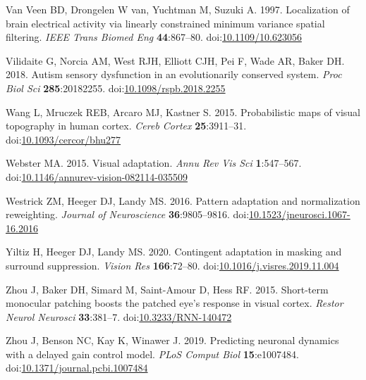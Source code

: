 \documentclass[
]{article}
\newlength{\cslhangindent}
\newlength{\cslentryspacingunit} %
\newenvironment{CSLReferences}[2] %
 {%
  \setlength{\parindent}{0pt}
  \ifodd #1
  \let\oldpar\par
  \def\par{\hangindent=\cslhangindent\oldpar}
  \fi
  \setlength{\parskip}{#2\cslentryspacingunit}
 }%
 {}
\begin{document}
\begin{CSLReferences}{1}{0}
\leavevmode{}%
Van Veen BD, Drongelen W van, Yuchtman M, Suzuki A. 1997. Localization of brain electrical activity via linearly constrained minimum variance spatial filtering. \emph{IEEE Trans Biomed Eng} \textbf{44}:867--80. doi:\href{https://doi.org/10.1109/10.623056}{10.1109/10.623056}

\leavevmode{}%
Vilidaite G, Norcia AM, West RJH, Elliott CJH, Pei F, Wade AR, Baker DH. 2018. Autism sensory dysfunction in an evolutionarily conserved system. \emph{Proc Biol Sci} \textbf{285}:20182255. doi:\href{https://doi.org/10.1098/rspb.2018.2255}{10.1098/rspb.2018.2255}

\leavevmode{}%
Wang L, Mruczek REB, Arcaro MJ, Kastner S. 2015. Probabilistic maps of visual topography in human cortex. \emph{Cereb Cortex} \textbf{25}:3911--31. doi:\href{https://doi.org/10.1093/cercor/bhu277}{10.1093/cercor/bhu277}

\leavevmode{}%
Webster MA. 2015. Visual adaptation. \emph{Annu Rev Vis Sci} \textbf{1}:547--567. doi:\href{https://doi.org/10.1146/annurev-vision-082114-035509}{10.1146/annurev-vision-082114-035509}

\leavevmode{}%
Westrick ZM, Heeger DJ, Landy MS. 2016. Pattern adaptation and normalization reweighting. \emph{Journal of Neuroscience} \textbf{36}:9805--9816. doi:\href{https://doi.org/10.1523/jneurosci.1067-16.2016}{10.1523/jneurosci.1067-16.2016}

\leavevmode{}%
Yiltiz H, Heeger DJ, Landy MS. 2020. Contingent adaptation in masking and surround suppression. \emph{Vision Res} \textbf{166}:72--80. doi:\href{https://doi.org/10.1016/j.visres.2019.11.004}{10.1016/j.visres.2019.11.004}

\leavevmode{}%
Zhou J, Baker DH, Simard M, Saint-Amour D, Hess RF. 2015. Short-term monocular patching boosts the patched eye's response in visual cortex. \emph{Restor Neurol Neurosci} \textbf{33}:381--7. doi:\href{https://doi.org/10.3233/RNN-140472}{10.3233/RNN-140472}

\leavevmode{}%
Zhou J, Benson NC, Kay K, Winawer J. 2019. Predicting neuronal dynamics with a delayed gain control model. \emph{PLoS Comput Biol} \textbf{15}:e1007484. doi:\href{https://doi.org/10.1371/journal.pcbi.1007484}{10.1371/journal.pcbi.1007484}

\end{CSLReferences}
\end{document}
